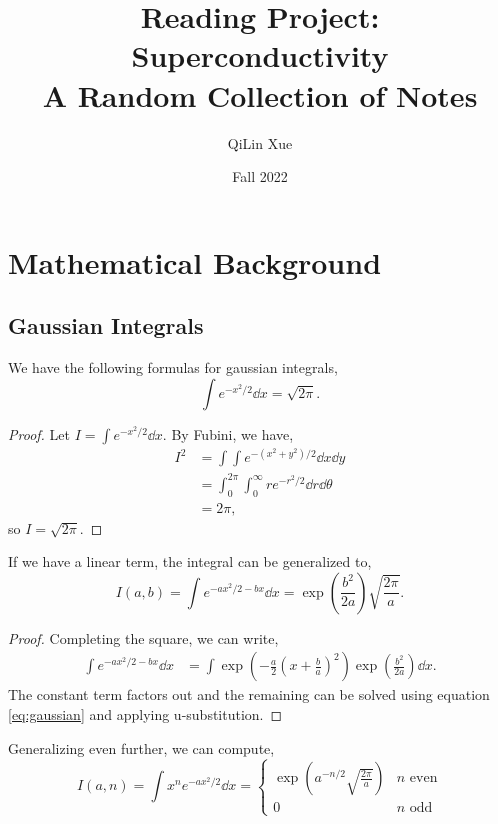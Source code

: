 \documentclass{article}
\title{Reading Project: Superconductivity \\ A Random Collection of Notes}
\author{QiLin Xue}
\date{Fall 2022}
\numberwithin{equation}{section}
\begin{document}
\maketitle
\tableofcontents
\newpage
\section{Mathematical Background}
\subsection{Gaussian Integrals}
We have the following formulas for gaussian integrals,
\begin{equation}
    \label{eq:gaussian}
    \boxed{\int e^{-x^2/2} \dd{x} = \sqrt{2\pi}}.
\end{equation}
\begin{proof}
    Let $I = \int e^{-x^2/2} \dd{x}.$ By Fubini, we have,
    \begin{align*}
        I^2 &= \int\int e^{-(x^2+y^2)/2}\dd{x}\dd{y} \\ 
        &= \int_0^{2\pi}\int_{0}^{\infty} r e^{-r^2/2}\dd{r}\dd{\theta} \\ 
        &= 2\pi,
    \end{align*}
    so $I = \sqrt{2\pi}.$
\end{proof}
If we have a linear term, the integral can be generalized to,
\begin{equation}
    \boxed{I(a,b) = \int e^{-ax^2/2-bx}\dd{x} =\exp\left(\frac{b^2}{2a}\right)\sqrt{\frac{2\pi}{a}}}.
\end{equation}
\begin{proof}
    Completing the square, we can write,
    \begin{align*}
        \int e^{-ax^2/2-bx}\dd{x} &= \int \exp\left(-\frac{a}{2}\left(x+\frac{b}{a}\right)^2\right)\exp\left(\frac{b^2}{2a}\right) \dd{x}.
    \end{align*}
    The constant term factors out and the remaining can be solved using equation \ref{eq:gaussian} and applying u-substitution. 
\end{proof}
Generalizing even further, we can compute,
\begin{equation}
    \boxed{I(a,n) = \int x^n e^{-ax^2/2}\dd{x} = \begin{cases}
        \exp\left(a^{-n/2}\sqrt{\frac{2\pi}{a}}\right) & n\text{ even} \\ 
        0 & n\text{ odd}
    \end{cases}}
\end{equation}
\end{document}
